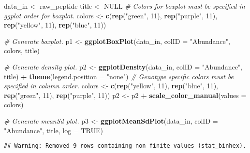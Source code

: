 \documentclass[]{article}
\newenvironment{Shaded}{\begin{snugshade}}{\end{snugshade}}
\newcommand{\KeywordTok}[1]{\textcolor[rgb]{0.13,0.29,0.53}{\textbf{#1}}}
\newcommand{\DataTypeTok}[1]{\textcolor[rgb]{0.13,0.29,0.53}{#1}}
\newcommand{\DecValTok}[1]{\textcolor[rgb]{0.00,0.00,0.81}{#1}}
\newcommand{\StringTok}[1]{\textcolor[rgb]{0.31,0.60,0.02}{#1}}
\newcommand{\CommentTok}[1]{\textcolor[rgb]{0.56,0.35,0.01}{\textit{#1}}}
\newcommand{\OtherTok}[1]{\textcolor[rgb]{0.56,0.35,0.01}{#1}}
\newcommand{\OperatorTok}[1]{\textcolor[rgb]{0.81,0.36,0.00}{\textbf{#1}}}
\newcommand{\NormalTok}[1]{#1}
\begin{document}
\begin{Shaded}
\begin{Highlighting}[]
\NormalTok{data_in <-}\StringTok{ }\NormalTok{raw_peptide}
\NormalTok{title <-}\StringTok{ }\OtherTok{NULL}
\CommentTok{# Colors for boxplot must be specified in ggplot order for boxplot.}
\NormalTok{colors <-}\StringTok{ }\KeywordTok{c}\NormalTok{(}\KeywordTok{rep}\NormalTok{(}\StringTok{"green"}\NormalTok{, }\DecValTok{11}\NormalTok{), }\KeywordTok{rep}\NormalTok{(}\StringTok{"purple"}\NormalTok{, }\DecValTok{11}\NormalTok{), }\KeywordTok{rep}\NormalTok{(}\StringTok{"yellow"}\NormalTok{, }\DecValTok{11}\NormalTok{), }\KeywordTok{rep}\NormalTok{(}\StringTok{"blue"}\NormalTok{, }\DecValTok{11}\NormalTok{))}

\CommentTok{# Generate boxplot.}
\NormalTok{p1 <-}\StringTok{ }\KeywordTok{ggplotBoxPlot}\NormalTok{(data_in, }\DataTypeTok{colID =} \StringTok{"Abundance"}\NormalTok{, colors, title)}

\CommentTok{# Generate density plot.}
\NormalTok{p2 <-}\StringTok{ }\KeywordTok{ggplotDensity}\NormalTok{(data_in, }\DataTypeTok{colID =} \StringTok{"Abundance"}\NormalTok{, title) }\OperatorTok{+}\StringTok{ }\KeywordTok{theme}\NormalTok{(}\DataTypeTok{legend.position =} \StringTok{"none"}\NormalTok{)}
\CommentTok{# Genotype specific colors must be specified in column order.}
\NormalTok{colors <-}\StringTok{ }\KeywordTok{c}\NormalTok{(}\KeywordTok{rep}\NormalTok{(}\StringTok{"yellow"}\NormalTok{, }\DecValTok{11}\NormalTok{), }\KeywordTok{rep}\NormalTok{(}\StringTok{"blue"}\NormalTok{, }\DecValTok{11}\NormalTok{), }\KeywordTok{rep}\NormalTok{(}\StringTok{"green"}\NormalTok{, }\DecValTok{11}\NormalTok{), }\KeywordTok{rep}\NormalTok{(}\StringTok{"purple"}\NormalTok{, }\DecValTok{11}\NormalTok{))}
\NormalTok{p2 <-}\StringTok{ }\NormalTok{p2 }\OperatorTok{+}\StringTok{ }\KeywordTok{scale_color_manual}\NormalTok{(}\DataTypeTok{values =}\NormalTok{ colors)}

\CommentTok{# Generate meanSd plot.}
\NormalTok{p3 <-}\StringTok{ }\KeywordTok{ggplotMeanSdPlot}\NormalTok{(data_in, }\DataTypeTok{colID =} \StringTok{"Abundance"}\NormalTok{, title, }\DataTypeTok{log =} \OtherTok{TRUE}\NormalTok{)}
\end{Highlighting}
\end{Shaded}

\begin{verbatim}
## Warning: Removed 9 rows containing non-finite values (stat_binhex).
\end{verbatim}
\end{document}

